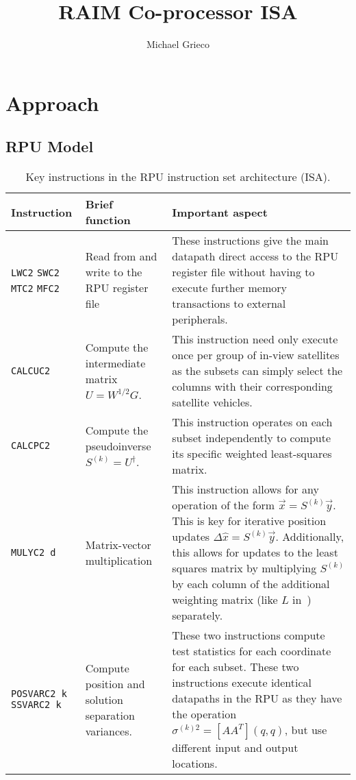 \documentclass[11pt]{article}
\title{RAIM Co-processor ISA}
\author{Michael Grieco}
\date{}
\begin{document}
\section{Approach}

\subsection{RPU Model}

\begin{table}[H] \centering
  \caption{Key instructions in the RPU instruction set architecture (ISA).}
  \label{tab:rpu_isa_highlight}
  \begin{tabular}{|m{2.5cm}|m{4cm}|m{10cm}|}
    \hline
    \textbf{Instruction} & \textbf{Brief function} & \textbf{Important aspect}\\ \hline
    
    \texttt{LWC2} \newline \texttt{SWC2} \newline \texttt{MTC2} \newline \texttt{MFC2} & Read from and write to the RPU register file & These instructions give the main datapath direct access to the RPU register file without having to execute further memory transactions to external peripherals.\\ \hline

    \texttt{CALCUC2} & Compute the intermediate matrix $U = W^{1/2}G$.  & This instruction need only execute once per group of in-view satellites as the subsets can simply select the columns with their corresponding satellite vehicles.\\ \hline

    \texttt{CALCPC2} & Compute the pseudoinverse $S^{(k)} = U^{\dagger}$. & This instruction operates on each subset independently to compute its specific weighted least-squares matrix.\\ \hline

    \texttt{MULYC2 d} & Matrix-vector multiplication & This instruction allows for any operation of the form $\vec{x} = S^{(k)} \vec{y}$. This is key for iterative position updates $\Delta \hat{x} = S^{(k)} \vec{y}$. Additionally, this allows for updates to the least squares matrix by multiplying $S^{(k)}$ by each column of the additional weighting matrix (like $L$ in~\cite{XXX}) separately.\\ \hline

    \texttt{POSVARC2 k} \newline \texttt{SSVARC2 k} & Compute position and solution separation variances. & These two instructions compute test statistics for each coordinate for each subset. These two instructions execute identical datapaths in the RPU as they have the operation $\sigma^{(k)2} = [A A^T](q, q)$, but use different input and output locations.\\ \hline


\end{tabular}
\end{table}
\end{document}
